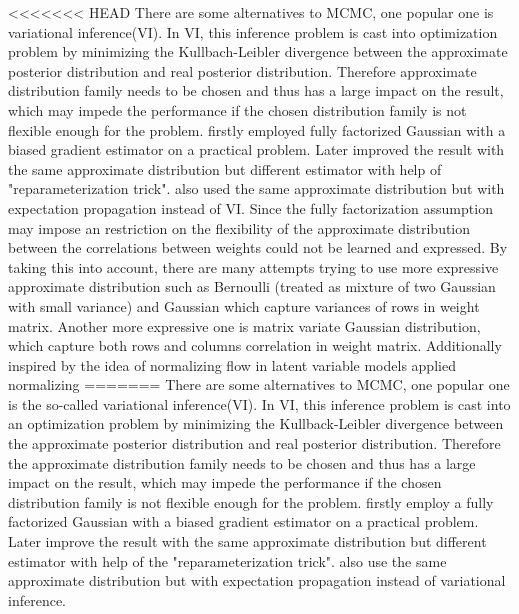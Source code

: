 <<<<<<< HEAD
There are some alternatives to MCMC, one popular one is variational inference(VI)\cite{hinton1993keeping}. In VI, this inference problem is cast into optimization problem by minimizing the Kullbach-Leibler divergence between the approximate posterior distribution and real posterior distribution. Therefore approximate distribution family needs to be chosen and thus has a large impact on the result, which may impede the performance if the chosen distribution family is not flexible enough for the problem. \cite{graves2011practical} firstly employed fully factorized Gaussian with a biased gradient estimator on a practical problem. Later \cite{blundell2015weight} improved the result with the same approximate distribution but different estimator with help of "reparameterization trick"\cite{kingma2013auto}. \citealp{hernandez2015probabilistic} also used the same approximate distribution but with expectation propagation\cite{minka2001expectation} instead of VI.
Since the fully factorization assumption may impose an restriction on the flexibility of the approximate distribution between the correlations between weights could not be learned and expressed. By taking this into account, there are many attempts trying to use more expressive approximate distribution such as Bernoulli (treated as mixture of two Gaussian with small variance)\cite{gal2016dropout} and Gaussian \cite{kingma2015variational} which capture variances of rows in weight matrix. Another more expressive one is matrix variate Gaussian distribution\cite{louizos2016structured}\cite{sun2017learning}\cite{zhang2017noisy}, which capture both rows and columns correlation in weight matrix. Additionally inspired by the idea of normalizing flow in latent variable models \cite{louizos2017multiplicative}applied normalizing
=======
There are some alternatives to MCMC, one popular one is the so-called variational inference(VI)\cite{hinton1993keeping}. In VI, this inference problem is cast into an optimization problem by minimizing the Kullback-Leibler divergence between the approximate posterior distribution and real posterior distribution. Therefore the approximate distribution family needs to be chosen and thus has a large impact on the result, which may impede the performance if the chosen distribution family is not flexible enough for the problem. \cite{graves2011practical} firstly employ a fully factorized Gaussian with a biased gradient estimator on a practical problem. Later \cite{blundell2015weight} improve the result with the same approximate distribution but different estimator with help of the "reparameterization trick"\cite{kingma2013auto}. \citealp{hernandez2015probabilistic} also use the same approximate distribution but with expectation propagation\cite{minka2001expectation} instead of variational inference.
